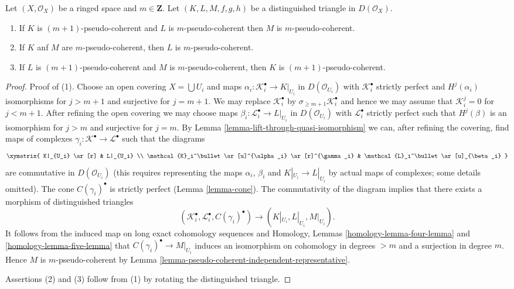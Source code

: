 \begin{lemma}
\label{lemma-cone-pseudo-coherent}
Let $(X, \mathcal{O}_X)$ be a ringed space and $m \in \mathbf{Z}$.
Let $(K, L, M, f, g, h)$ be a distinguished triangle in $D(\mathcal{O}_X)$.
\begin{enumerate}
\item If $K$ is $(m + 1)$-pseudo-coherent and $L$ is $m$-pseudo-coherent
then $M$ is $m$-pseudo-coherent.
\item If $K$ anf $M$ are $m$-pseudo-coherent, then $L$ is $m$-pseudo-coherent.
\item If $L$ is $(m + 1)$-pseudo-coherent and $M$
is $m$-pseudo-coherent, then $K$ is $(m + 1)$-pseudo-coherent.
\end{enumerate}
\end{lemma}

\begin{proof}
Proof of (1). Choose an open covering $X = \bigcup U_i$ and
maps $\alpha_i : \mathcal{K}_i^\bullet \to K|_{U_i}$ in $D(\mathcal{O}_{U_i})$
with $\mathcal{K}_i^\bullet$ strictly perfect and $H^j(\alpha_i)$
isomorphisms for $j > m + 1$ and surjective for $j = m + 1$.
We may replace $\mathcal{K}_i^\bullet$ by
$\sigma_{\geq m + 1}\mathcal{K}_i^\bullet$
and hence we may assume that $\mathcal{K}_i^j = 0$
for $j < m + 1$. After refining the open covering we may choose
maps $\beta_i : \mathcal{L}_i^\bullet \to L|_{U_i}$ in $D(\mathcal{O}_{U_i})$
with $\mathcal{L}_i^\bullet$ strictly perfect such that
$H^j(\beta)$ is an isomorphism for $j > m$ and
surjective for $j = m$. By
Lemma \ref{lemma-lift-through-quasi-isomorphism}
we can, after refining the covering, find maps of complexes
$\gamma_i : \mathcal{K}^\bullet \to \mathcal{L}^\bullet$
such that the diagrams
$$
\xymatrix{
K|_{U_i} \ar[r] & L|_{U_i} \\
\mathcal{K}_i^\bullet \ar[u]^{\alpha_i} \ar[r]^{\gamma_i} &
\mathcal{L}_i^\bullet \ar[u]_{\beta_i}
}
$$
are commutative in $D(\mathcal{O}_{U_i})$ (this requires representing the
maps $\alpha_i$, $\beta_i$ and $K|_{U_i} \to L|_{U_i}$
by actual maps of complexes; some details omitted).
The cone $C(\gamma_i)^\bullet$ is strictly perfect (Lemma \ref{lemma-cone}).
The commutativity of the diagram implies that there exists a morphism
of distinguished triangles
$$
(\mathcal{K}_i^\bullet, \mathcal{L}_i^\bullet, C(\gamma_i)^\bullet)
\longrightarrow
(K|_{U_i}, L|_{U_i}, M|_{U_i}).
$$
It follows from the induced map on long exact cohomology sequences and
Homology, Lemmas \ref{homology-lemma-four-lemma} and
\ref{homology-lemma-five-lemma}
that $C(\gamma_i)^\bullet \to M|_{U_i}$ induces an isomorphism
on cohomology in degrees $> m$ and a surjection in degree $m$.
Hence $M$ is $m$-pseudo-coherent by
Lemma \ref{lemma-pseudo-coherent-independent-representative}.

\medskip\noindent
Assertions (2) and (3) follow from (1) by rotating the distinguished
triangle.
\end{proof}

